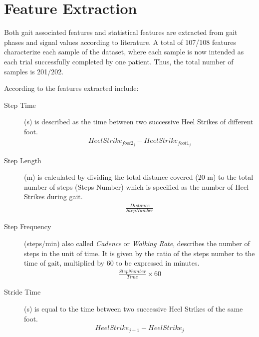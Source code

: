 \section{Feature Extraction}

Both gait associated features and statistical features are extracted from gait phases and signal values according to literature. A total of 107/108 features characterize each sample of the dataset, where each sample is now intended as each trial successfully completed by one patient. Thus, the total number of samples is 201/202.

According to \cite{TheSmartInsoleDataset} the features extracted include:
\begin{description}

\item[Step Time]
 (s) is described as the time between two successive Heel Strikes of different foot.
\begin{equation}
\begin{aligned}
HeelStrike_{foot2_j} - HeelStrike_{foot1_j}
\end{aligned}
\end{equation}

\item[Step Length] 
 (m) is calculated by dividing the total distance covered (20 m) to the total number of steps (Steps Number) which is specified as the number of Heel Strikes during gait.
\begin{equation}
\begin{aligned}
\frac{Distance}{StepNumber}
\end{aligned}
\end{equation}

\item[Step Frequency] 
 (steps/min) also called \textit{Cadence} or \textit{Walking Rate}, describes the number of steps in the unit of time. It is given by the ratio of the steps number to the time of gait, multiplied by 60 to be expressed in minutes.
\begin{equation}
\begin{aligned}
\frac{Step Number}{Time} \times 60
\end{aligned}
\end{equation}

\item[Stride Time] 
(s) is equal to the time between two successive Heel Strikes of the same foot.
\begin{equation}
\begin{aligned}
HeelStrike_{j+1} - HeelStrike_{j}
\end{aligned}
\end{equation}


\end{description}
